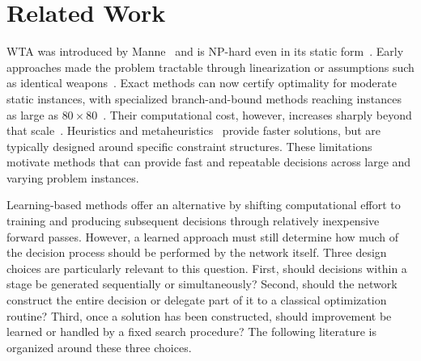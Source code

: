 \section{Related Work}
\label{sec:related}

WTA was introduced by Manne~\cite{manne1958target} and is NP-hard even in its static form~\cite{lloyd1986weapons}. Early approaches made the problem tractable through linearization or assumptions such as identical weapons~\cite{day1966allocating,firstman1960approximating,hodson1971linear,bracken1968selected,denbroeder1959optimum}. Exact methods can now certify optimality for moderate static instances, with specialized branch-and-bound methods reaching instances as large as $80\times80$~\cite{ahuja2007exact}. Their computational cost, however, increases sharply beyond that scale~\cite{johansson2009empirical,kline2019weapon}. Heuristics and metaheuristics~\cite{kolitz1988analysis,lee2002immunity,lee2003efficiently,lee2003genetic,durgut2017artificial,sonuc2017parallel,chang2018solving,metler1990suite} provide faster solutions, but are typically designed around specific constraint structures. These limitations motivate methods that can provide fast and repeatable decisions across large and varying problem instances.

Learning-based methods offer an alternative by shifting computational effort to training and producing subsequent decisions through relatively inexpensive forward passes. However, a learned approach must still determine how much of the decision process should be performed by the network itself. Three design choices are particularly relevant to this question. First, should decisions within a stage be generated sequentially or simultaneously? Second, should the network construct the entire decision or delegate part of it to a classical optimization routine? Third, once a solution has been constructed, should improvement be learned or handled by a fixed search procedure? The following literature is organized around these three choices.


